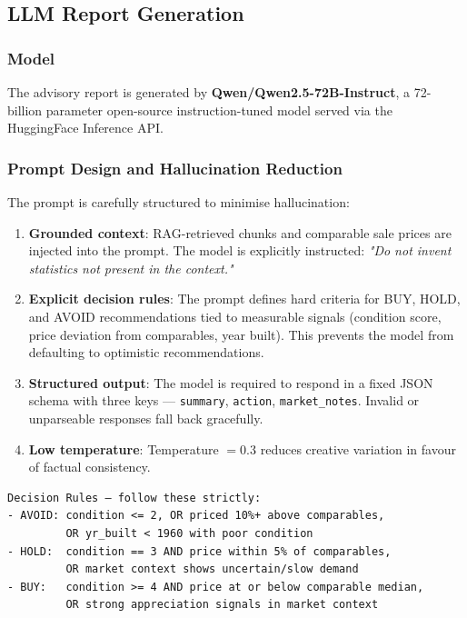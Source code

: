 \documentclass[12pt, a4paper]{article}
\begin{document}
\subsection{LLM Report Generation}

\subsubsection{Model}
The advisory report is generated by \textbf{Qwen/Qwen2.5-72B-Instruct}, a 72-billion
parameter open-source instruction-tuned model served via the HuggingFace Inference API.

\subsubsection{Prompt Design and Hallucination Reduction}

The prompt is carefully structured to minimise hallucination:

\begin{enumerate}[leftmargin=1.6em]
  \item \textbf{Grounded context}: RAG-retrieved chunks and comparable sale prices
        are injected into the prompt. The model is explicitly instructed:
        \textit{"Do not invent statistics not present in the context."}
  \item \textbf{Explicit decision rules}: The prompt defines hard criteria for
        BUY, HOLD, and AVOID recommendations tied to measurable signals (condition
        score, price deviation from comparables, year built). This prevents the model
        from defaulting to optimistic recommendations.
  \item \textbf{Structured output}: The model is required to respond in a fixed JSON
        schema with three keys --- \texttt{summary}, \texttt{action}, \texttt{market\_notes}.
        Invalid or unparseable responses fall back gracefully.
  \item \textbf{Low temperature}: Temperature $= 0.3$ reduces creative variation in
        favour of factual consistency.
\end{enumerate}

\begin{lstlisting}[language={}, caption={Decision rules embedded in the advisory prompt}]
Decision Rules — follow these strictly:
- AVOID: condition <= 2, OR priced 10%+ above comparables,
         OR yr_built < 1960 with poor condition
- HOLD:  condition == 3 AND price within 5% of comparables,
         OR market context shows uncertain/slow demand
- BUY:   condition >= 4 AND price at or below comparable median,
         OR strong appreciation signals in market context
\end{lstlisting}
\end{document}
